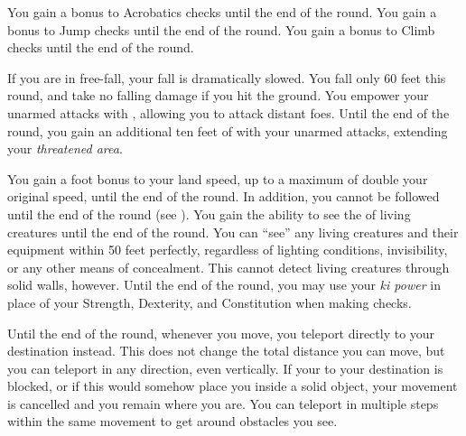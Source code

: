             You gain a  bonus to Acrobatics checks until the end of the round.
            You gain a  bonus to Jump checks until the end of the round.
            You gain a  bonus to Climb checks until the end of the round.

            If you are in free-fall, your fall is dramatically slowed.
            You fall only 60 feet this round, and take no falling damage if you hit the ground.
            You empower your unarmed attacks with \ki, allowing you to attack distant foes.
            Until the end of the round, you gain an additional ten feet of  with your unarmed attacks, extending your \textit{threatened area}.

            You gain a  foot bonus to your land speed, up to a maximum of double your original speed, until the end of the round.
            In addition, you cannot be followed until the end of the round (see ).
            You gain the ability to see the \ki of living creatures until the end of the round.
            You can ``see'' any living creatures and their equipment within 50 feet perfectly, regardless of lighting conditions, invisibility, or any other means of concealment.
            This cannot detect living creatures through solid walls, however.
            Until the end of the round, you may use your \textit{ki power} in place of your Strength, Dexterity, and Constitution when making checks.

            Until the end of the round, whenever you move, you teleport directly to your destination instead.
            This does not change the total distance you can move, but you can teleport in any direction, even vertically.
            If your  to your destination is blocked, or if this would somehow place you inside a solid object, your movement is cancelled and you remain where you are.
            You can teleport in multiple steps within the same movement to get around obstacles you see.


